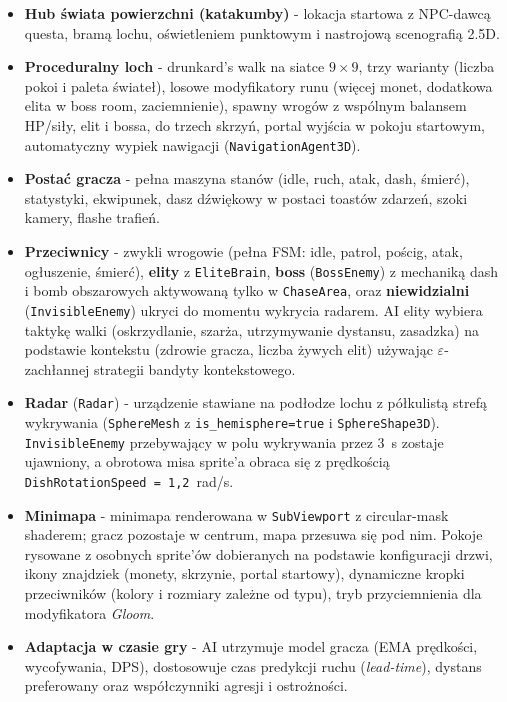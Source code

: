 \begin{itemize}
    \item \textbf{Hub świata powierzchni (katakumby)} - lokacja startowa z NPC-dawcą questa, bramą lochu, oświetleniem punktowym i nastrojową scenografią 2.5D.
    \item \textbf{Proceduralny loch} - drunkard's walk na siatce $9 \times 9$, trzy warianty (liczba pokoi i paleta świateł), losowe modyfikatory runu (więcej monet, dodatkowa elita w boss room, zaciemnienie), spawny wrogów z wspólnym balansem HP/siły, elit i bossa, do trzech skrzyń, portal wyjścia w pokoju startowym, automatyczny wypiek nawigacji (\texttt{NavigationAgent3D}).
    \item \textbf{Postać gracza} - pełna maszyna stanów (idle, ruch, atak, dash, śmierć), statystyki, ekwipunek, dasz dźwiękowy w postaci toastów zdarzeń, szoki kamery, flashe trafień.
    \item \textbf{Przeciwnicy} - zwykli wrogowie (pełna FSM: idle, patrol, pościg, atak, ogłuszenie, śmierć), \textbf{elity} z \texttt{EliteBrain}, \textbf{boss} (\texttt{BossEnemy}) z mechaniką dash i bomb obszarowych aktywowaną tylko w \texttt{ChaseArea}, oraz \textbf{niewidzialni} (\texttt{InvisibleEnemy}) ukryci do momentu wykrycia radarem. AI elity wybiera taktykę walki (oskrzydlanie, szarża, utrzymywanie dystansu, zasadzka) na podstawie kontekstu (zdrowie gracza, liczba żywych elit) używając $\varepsilon$-zachłannej strategii bandyty kontekstowego.
    \item \textbf{Radar} (\texttt{Radar}) - urządzenie stawiane na podłodze lochu z półkulistą strefą wykrywania (\texttt{SphereMesh} z \texttt{is\_hemisphere=true} i \texttt{SphereShape3D}). \texttt{InvisibleEnemy} przebywający w polu wykrywania przez 3~s zostaje ujawniony, a obrotowa misa sprite'a obraca się z prędkością \texttt{DishRotationSpeed = 1,2}~rad/s.
    \item \textbf{Minimapa} - minimapa renderowana w \texttt{SubViewport} z circular-mask shaderem; gracz pozostaje w centrum, mapa przesuwa się pod nim. Pokoje rysowane z osobnych sprite'ów dobieranych na podstawie konfiguracji drzwi, ikony znajdziek (monety, skrzynie, portal startowy), dynamiczne kropki przeciwników (kolory i rozmiary zależne od typu), tryb przyciemnienia dla modyfikatora \textit{Gloom}.
    \item \textbf{Adaptacja w czasie gry} - AI utrzymuje model gracza (EMA prędkości, wycofywania, DPS), dostosowuje czas predykcji ruchu (\textit{lead-time}), dystans preferowany oraz współczynniki agresji i ostrożności.

\end{itemize}
